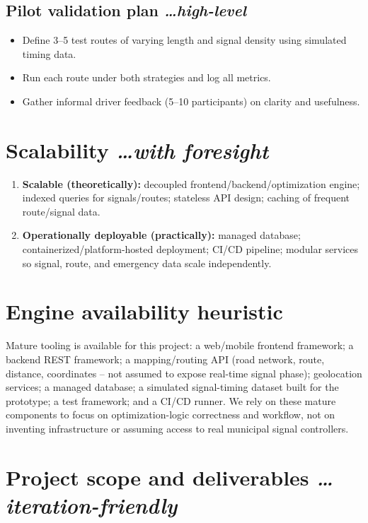 \documentclass[11pt,a4paper]{article}
\newcommand{\BvrHint}[1]{%
  {\normalfont\normalsize\itshape\hfill #1}}
\begin{document}
\subsection{Pilot validation plan %
\BvrHint{\ldots high-level}}
\begin{itemize}[leftmargin=0.7cm]
    \item Define 3--5 test routes of varying length and signal density using simulated timing data.
    \item Run each route under both strategies and log all metrics.
    \item Gather informal driver feedback (5--10 participants) on clarity and usefulness.
\end{itemize}

\section{Scalability %
\BvrHint{\ldots with foresight}}
\begin{enumerate}[leftmargin=0.7cm]
    \item \textbf{Scalable (theoretically):} decoupled frontend/backend/optimization engine; indexed queries for signals/routes; stateless API design; caching of frequent route/signal data.
    \item \textbf{Operationally deployable (practically):} managed database; containerized/platform-hosted deployment; CI/CD pipeline; modular services so signal, route, and emergency data scale independently.
\end{enumerate}

\section{Engine availability heuristic}
Mature tooling is available for this project: a web/mobile frontend framework; a backend REST framework; a mapping/routing API (road network, route, distance, coordinates -- not assumed to expose real-time signal phase); geolocation services; a managed database; a simulated signal-timing dataset built for the prototype; a test framework; and a CI/CD runner. We rely on these mature components to focus on optimization-logic correctness and workflow, not on inventing infrastructure or assuming access to real municipal signal controllers.

\section{Project scope and deliverables %
\BvrHint{\ldots iteration-friendly}}
\end{document}
